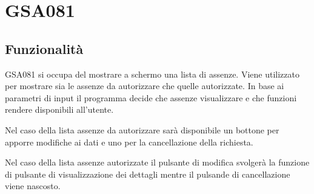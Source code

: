 \documentclass[target=bach,aauheader=,style=]{thud}
\begin{document}
\section{GSA081}
\subsection{Funzionalità}
GSA081 si occupa del mostrare a schermo una lista di assenze. Viene utilizzato per mostrare sia le assenze da autorizzare che quelle autorizzate.
In base ai parametri di input il programma decide che assenze visualizzare e che funzioni rendere disponibili all'utente.

Nel caso della lista assenze da autorizzare sarà disponibile un bottone per apporre modifiche ai dati e uno per la cancellazione della richiesta.

Nel caso della lista assenze autorizzate il pulsante di modifica svolgerà la funzione di pulsante di visualizzazione dei dettagli mentre il pulsande di cancellazione viene nascosto.
\end{document}
